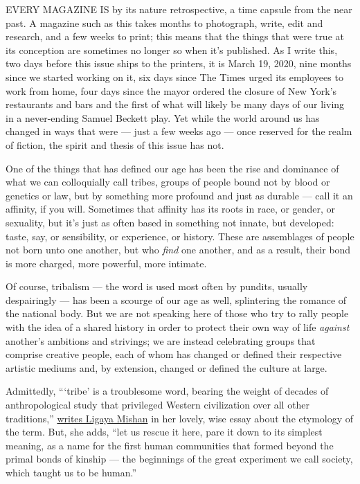 EVERY MAGAZINE IS by its nature retrospective, a time capsule from the
near past. A magazine such as this takes months to photograph, write,
edit and research, and a few weeks to print; this means that the things
that were true at its conception are sometimes no longer so when it's
published. As I write this, two days before this issue ships to the
printers, it is March 19, 2020, nine months since we started working on
it, six days since The Times urged its employees to work from home, four
days since the mayor ordered the closure of New York's restaurants and
bars and the first of what will likely be many days of our living in a
never-ending Samuel Beckett play. Yet while the world around us has
changed in ways that were --- just a few weeks ago --- once reserved for
the realm of fiction, the spirit and thesis of this issue has not.

One of the things that has defined our age has been the rise and
dominance of what we can colloquially call tribes, groups of people
bound not by blood or genetics or law, but by something more profound
and just as durable --- call it an affinity, if you will. Sometimes that
affinity has its roots in race, or gender, or sexuality, but it's just
as often based in something not innate, but developed: taste, say, or
sensibility, or experience, or history. These are assemblages of people
not born unto one another, but who \emph{find} one another, and as a
result, their bond is more charged, more powerful, more intimate.

Of course, tribalism --- the word is used most often by pundits, usually
despairingly --- has been a scourge of our age as well, splintering the
romance of the national body. But we are not speaking here of those who
try to rally people with the idea of a shared history in order to
protect their own way of life \emph{against} another's ambitions and
strivings; we are instead celebrating groups that comprise creative
people, each of whom has changed or defined their respective artistic
mediums and, by extension, changed or defined the culture at large.

Admittedly, ```tribe' is a troublesome word, bearing the weight of
decades of anthropological study that privileged Western civilization
over all other traditions,''
\href{https://www.nytimes.com/interactive/2020/04/13/t-magazine/tribe-meaning.html}{writes
Ligaya Mishan} in her lovely, wise essay about the etymology of the
term. But, she adds, ``let us rescue it here, pare it down to its
simplest meaning, as a name for the first human communities that formed
beyond the primal bonds of kinship --- the beginnings of the great
experiment we call society, which taught us to be human.''

